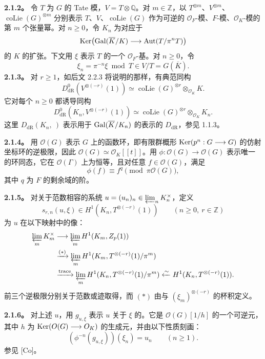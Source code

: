 \textbf{2.1.2。} 令 $T$ 为 $G$ 的 Tate 模，$V=T\otimes\mathbb Q$。对 $m\in\mathbb Z$，以 $T^{\otimes m}$、$V^{\otimes m}$、$\operatorname{coLie}(G)^{\otimes m}$ 分别表示 $T$、$V$、$\operatorname{coLie}(G)$ 作为可逆的 $\mathcal O_F$-模、$F$-模、$\mathcal O_K$-模的第 $m$ 个张量幂。对 $n\ge0$，令 $K_n$ 为对应于
\[
 \Ker\bigl(\Gal(\overline K/K)\longrightarrow\operatorname{Aut}(T/\pi^nT)\bigr)
\]
的 $K$ 的扩张。下文用 $\xi$ 表示 $T$ 的一个 $\mathcal O_F$-基。对 $n\ge0$，令
\[
 \xi_n=\pi^{-n}\xi\bmod T\in V/T=G(\overline K).
\]
\textbf{2.1.3。} 对 $r\ge1$，如后文 2.2.3 将说明的那样，有典范同构
\begin{equation*}
 D^0_{\mathrm{dR}}(V^{\otimes(-r)}(1))\simeq\operatorname{coLie}(G)^{\otimes r}\otimes_{\mathcal O_K}K.\tag{1}
\end{equation*}
它对每个 $n\ge0$ 都诱导同构
\begin{equation*}
 D^0_{\mathrm{dR}}(K_n,V^{\otimes(-r)}(1))\simeq\operatorname{coLie}(G)^{\otimes r}\otimes_{\mathcal O_K}K_n.\tag{2}
\end{equation*}
这里 $D_{\mathrm{dR}}(K_n,\ )$ 表示用于 $\Gal(\overline K/K_n)$ 的表示的 $D_{\mathrm{dR}}$，参见 1.1.3。

\textbf{2.1.4。} 用 $\mathcal O(G)$ 表示 $G$ 上的函数环，即有限群概形 $\Ker(p^n:G\longrightarrow G)$ 的仿射坐标环的逆极限，因此 $\mathcal O(G)\simeq\mathcal O_K[[t]]$。用 $\phi:\mathcal O(G)\longrightarrow\mathcal O(G)$ 表示唯一的环同态，它在 $\mathcal O(\Gamma)$ 上为恒等，且对任意 $f\in\mathcal O(G)$，满足
\[
 \phi(f)\equiv f^q\pmod{\pi\mathcal O(G)},
\]
其中 $q$ 为 $F$ 的剩余域的阶。

\textbf{2.1.5。} 对关于范数相容的系统 $u=(u_n)_n\in\varprojlim_n K_n^\times$，定义
\[
 s_{r,n}(u,\xi)\in H^1(K_n,T^{\otimes(-r)}(1))\qquad(n\ge0,\ r\in\mathbb Z)
\]
为 $u$ 在以下映射中的像：
\begin{align*}
 \varprojlim_m K_m^\times
 &\longrightarrow\varprojlim_m H^1(K_m,\mathbb Z_p(1))\\
 &\xrightarrow{(*)}\varprojlim_m H^1(K_m,T^{\otimes(-r)}(1)/\pi^m)\\
 &\xrightarrow{\mathrm{trace}}\varprojlim_m H^1(K_n,T^{\otimes(-r)}(1)/\pi^m)
 \xleftarrow{\sim}H^1(K_n,T^{\otimes(-r)}(1)).
\end{align*}
前三个逆极限分别关于范数或迹取得，而 $(*)$ 由与 $(\xi_m)^{\otimes(-r)}$ 的杯积定义。

\textbf{2.1.6。} 对上述 $u$，用 $g_{u,\xi}$ 表示 $u$ 关于 $\xi$ 的。它是 $\mathcal O(G)[1/h]$ 的一个可逆元，其中 $h$ 为 $\Ker(\mathcal O(G)\longrightarrow\mathcal O_K)$ 的生成元，并由以下性质刻画：
\[
 (\phi^{-n}(g_{u,\xi}))(\xi_n)=u_n\qquad(n\ge1).
\]
参见 [Co]。

